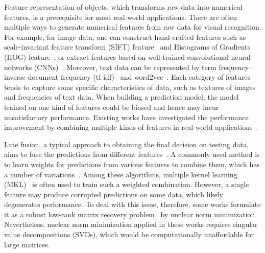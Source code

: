 \documentclass[10pt,twocolumn,letterpaper]{article}
\begin{document}
Feature representation of objects, which transforms raw data into numerical features, is a prerequisite for most real-world applications.
There are often multiple ways to generate numerical features from raw data for visual recognition.
For example, for image data, one can construct hand-crafted features such as scale-invariant feature transform
(SIFT) feature~\cite{loweijcv2004distinctive} and Histograms of Gradients (HOG) feature~\cite{dalalcvpr2005histograms},
or extract features based on well-trained convolutional neural networks (CNNs)~\cite{krizhevsky2012imagenet}.
Moreover, text data can be represented by term frequency–inverse document frequency (tf-idf)~\cite{manning2008introduction} and word2vec~\cite{mikoloviclr2013efficient}.
Each category of features tends to capture some specific characteristics of data,
such as textures of images and frequencies of text data.
When building a prediction model, the model trained on one kind of features could be biased and hence may incur unsatisfactory performance.
Existing works have investigated the performance improvement by combining multiple kinds of features in real-world applications~\cite{gehler2009feature,ye2012robust,xuiccv2013feature,lai2015learning}.


Late fusion, a typical approach to obtaining the final decision on testing data, aims to fuse the predictions from different features~\cite{ye2012robust,xuiccv2013feature,lai2015learning,vanicassp2014late}.
A commonly used method is to learn weights for predictions from various features to combine them, which has a number of variations~\cite{gehler2009feature,xuiccv2013feature,lai2015learning}.
Among these algorithms, multiple kernel learning (MKL)~\cite{lanckriet2004learning,Rakotomamonjy2008Simplemkl} is often used to train such a weighted combination.
However, a single feature may produce corrupted predictions on some data, which likely degenerates performance.
To deal with this issue, therefore, some works formulate it as a robust low-rank matrix recovery problem~\cite{gaoijcai2016robust,ye2012robust} by nuclear norm minimization.
Nevertheless, nuclear norm minimization applied in these works requires singular value decompositions (SVDs), which would be computationally unaffordable for large matrices.
\end{document}
